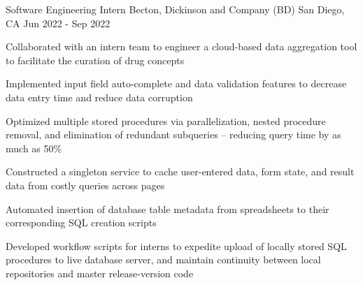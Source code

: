 

\begin{cventries}

  \cventry
    {Software Engineering Intern} %
    {Becton, Dickinson and Company (BD)} %
    {San Diego, CA} %
    {Jun 2022 - Sep 2022} %
    {\begin{cvitems} %
        \item {Collaborated with an intern team to engineer a cloud-based data aggregation tool to facilitate the curation of drug concepts} 
        \item { Implemented input field auto-complete and data validation features to decrease data entry time and reduce data corruption }
        \item {Optimized multiple stored procedures via parallelization, nested procedure removal, and elimination of redundant subqueries -- reducing query time by as much as 50\%}
        \item {Constructed a singleton service to cache user-entered data, form state, and result data from costly queries across pages}
        \item {Automated insertion of database table metadata from spreadsheets to their corresponding SQL creation scripts}
        \item {Developed workflow scripts for interns to expedite upload of locally stored SQL procedures to live database server, and maintain continuity between local repositories and master release-version code}
      \end{cvitems}
    }
    

\end{cventries}
